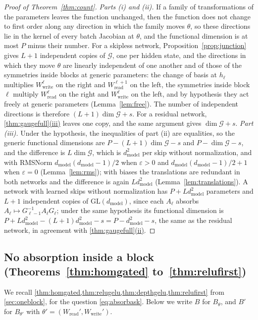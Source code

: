 \documentclass[10pt]{article}
\theoremstyle{definition}
\theoremstyle{remark}
\newcommand{\Wread}{W_{\mathrm{read}}}
\newcommand{\Wwrite}{W_{\mathrm{write}}}
\newcommand{\dm}{d_{\mathrm{model}}}
\newcommand{\GL}{\mathrm{GL}}
\newcommand{\G}{\mathcal{G}}
\DeclareRobustCommand{\cpref}[2]{\hyperref[#1:#2]{\cref*{#1}(#2)}}
\begin{document}
\begin{proof}[Proof of Theorem~\ref{thm:count}]
\emph{Parts (i) and (ii).} If a family of transformations of the parameters leaves the function unchanged, then the function does not change to first order along any direction in which the family moves $\theta$, so these directions lie in the kernel of every batch Jacobian at $\theta$, and the functional dimension is at most $P$ minus their number. For a skipless network, Proposition~\ref{prop:junction} gives $L+1$ independent copies of $\G$, one per hidden state, and the directions in which they move $\theta$ are linearly independent of one another and of those of the symmetries inside blocks at generic parameters: the change of basis at $h_{\ell}$ multiplies $\Wwrite^{\ell}$ on the right and $\Wread^{\ell+1}$ on the left, the symmetries inside block $\ell$ multiply $\Wread^{\ell}$ on the right and $\Wwrite^{\ell}$ on the left, and by hypothesis they act freely at generic parameters (Lemma~\ref{lem:free}). The number of independent directions is therefore $(L+1)\dim\G + s$. For a residual network, \cpref{thm:gaugefull}{iii} leaves one copy, and the same argument gives $\dim\G + s$.
\emph{Part (iii).} Under the hypothesis, the inequalities of part (ii) are equalities, so the generic functional dimensions are $P - (L+1)\dim\G - s$ and $P - \dim\G - s$, and the difference is $L\dim\G$, which is $\dm^2$ per skip without normalization, and with RMSNorm $\dm(\dm-1)/2$ when $\varepsilon > 0$ and $\dm(\dm-1)/2 + 1$ when $\varepsilon = 0$ (Lemma~\ref{lem:rms}); with biases the translations are redundant in both networks and the difference is again $L\dm^2$ (Lemma~\ref{lem:translations}). A network with learned skips without normalization has $P + L\dm^2$ parameters and $L+1$ independent copies of $\GL(\dm)$, since each $A_\ell$ absorbs $A_\ell \mapsto G_{\ell-1}^{-1}A_\ell G_\ell$; under the same hypothesis its functional dimension is $P + L\dm^2 - (L+1)\dm^2 - s = P - \dm^2 - s$, the same as the residual network, in agreement with \cpref{thm:gaugefull}{ii}.
\end{proof}


\subsection{No absorption inside a block\texorpdfstring{ (Theorems~\ref*{thm:homgated} to~\ref*{thm:relufirst})}{}}\label{app:absorb}

We recall \cref{thm:homgated,thm:relugelu,thm:depthgelu,thm:relufirst} from \cref{sec:oneblock}, for the question \eqref{eq:absorbask}. Below we write $B$ for $B_\theta$, and $B'$ for $B_{\theta'}$ with $\theta' = (\Wread', \Wwrite')$.
\thmAbsorbHom*
\thmAbsorbReLU*
\thmAbsorbDepth*
\thmAbsorbFirst*
\end{document}
